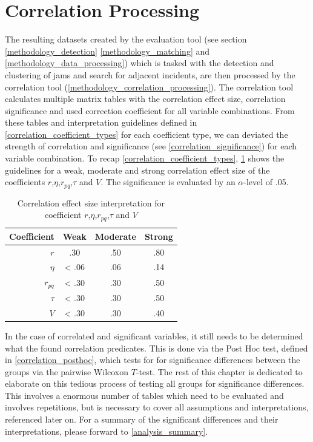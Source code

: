 \section{Correlation Processing}
\label{analysis_processing_correlation}
The resulting datasets created by the evaluation tool (see section \cref{methodology_detection} \cref{methodology_matching} and \cref{methodology_data_processing}) which is tasked with the detection and clustering of jams and search for adjacent incidents, are then processed by the correlation tool (\cref{methodology_correlation_processing}). The correlation tool calculates multiple matrix tables with the correlation effect size, correlation significance and used correction coefficient for all variable combinations. From these tables and interpretation guidelines defined in \cref{correlation_coefficient_types} for each coefficient type, we can deviated the strength of correlation and significance (see \cref{correlation_significance}) for each variable combination. To recap \cref{correlation_coefficient_types}, \cref{tbl:correlation_interpretation_guidelines} shows the guidelines for a weak, moderate and strong correlation effect size of the coefficients $r$,$\eta$,$r_{pq}$,$\tau$ and $V$. The significance is evaluated by an $\alpha$-level of .05.
\begin{table}[ht!]
	\centering
	\begin{tabular}{r|c|c|c}  
		\toprule
		Coefficient & Weak 	& Moderate 	& Strong \\
		\midrule
		$r$ 		& .30	& .50		& .80 \\
		$\eta$ 		& < .06 & .06		& .14 \\
		$r_{pq}$	& < .30	& .30		& .50 \\
		$\tau$ 		& < .30	& .30		& .50 \\
		$V$ 		& < .30	& .30		& .40 \\
		\bottomrule
	\end{tabular}
	\caption{Correlation effect size interpretation for coefficient $r$,$\eta$,$r_{pq}$,$\tau$ and $V$}
	\label{tbl:correlation_interpretation_guidelines}
\end{table}
In the case of correlated and significant variables, it still needs to be determined what the found correlation predicates. This is done via the Post Hoc test, defined in \cref{correlation_posthoc}, which tests for for significance differences between the groups via the pairwise Wilcoxon $T$-test. The rest of this chapter is dedicated to elaborate on this tedious process of testing all groups for significance differences. This involves a enormous number of tables which need to be evaluated and involves repetitions, but is necessary to cover all assumptions and interpretations, referenced later on. For a summary of the significant differences and their interpretations, please forward to \cref{analysis_summary}.

